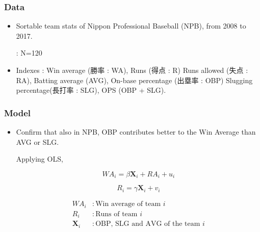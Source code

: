 \documentclass[dvipdfmx,12pt]{beamer}
\begin{document}
\begin{frame}\frametitle{Data}

 \begin{itemize}
 
 \item Sortable team stats of Nippon Professional Baseball (NPB), from 2008 to 2017.
 
 : N=120
 
 \item Indexes : Win average (勝率 : WA), Runs (得点 : R) Runs allowed (失点 : RA), Batting average (AVG),
 On-base percentage (出塁率 : OBP) Slugging percentage(長打率 : SLG), OPS (OBP + SLG).
 
 \end{itemize}

\end{frame}

\begin{frame}\frametitle{Model}

 \begin{itemize}
 
 \item Confirm that also in NPB, OBP contributes better to the Win Average than AVG or SLG.
 
 Applying OLS,
 
 \[\textit{WA}_i = \beta \mathbf{X}_i + \textit{RA}_i + u_i \]
 
 \[\textit{R}_i = \gamma \mathbf{X}_i + v_i \]
  
  \begin{align*}
  \textit{WA}_i &: \text{Win average of team } i \\
  \textit{R}_i &: \text{Runs of team } i \\
  \mathbf{X}_i &: \text{OBP, SLG and AVG of the team } i
  \end{align*}
 
 \end{itemize}

\end{frame}
\end{document}
